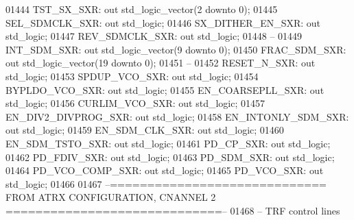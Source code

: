 \begin{DoxyCode}
01444         TST\_SX\_SXR:     \textcolor{keywordflow}{out} \textcolor{comment}{std\_logic\_vector}(\textcolor{vhdllogic}{}\textcolor{vhdllogic}{2} \textcolor{keywordflow}{downto} \textcolor{vhdllogic}{}\textcolor{vhdllogic}{0});
01445         SEL\_SDMCLK\_SXR: \textcolor{keywordflow}{out} \textcolor{comment}{std\_logic};
01446         SX\_DITHER\_EN\_SXR:   \textcolor{keywordflow}{out} \textcolor{comment}{std\_logic};
01447         REV\_SDMCLK\_SXR: \textcolor{keywordflow}{out} \textcolor{comment}{std\_logic};
01448 \textcolor{keyword}{        --}
01449         INT\_SDM\_SXR:    \textcolor{keywordflow}{out} \textcolor{comment}{std\_logic\_vector}(\textcolor{vhdllogic}{}\textcolor{vhdllogic}{9} \textcolor{keywordflow}{downto} \textcolor{vhdllogic}{}\textcolor{vhdllogic}{0});
01450         FRAC\_SDM\_SXR:   \textcolor{keywordflow}{out} \textcolor{comment}{std\_logic\_vector}(\textcolor{vhdllogic}{}\textcolor{vhdllogic}{19} \textcolor{keywordflow}{downto} \textcolor{vhdllogic}{}\textcolor{vhdllogic}{0});
01451 \textcolor{keyword}{        --}
01452         RESET\_N\_SXR:    \textcolor{keywordflow}{out} \textcolor{comment}{std\_logic};
01453         SPDUP\_VCO\_SXR:  \textcolor{keywordflow}{out} \textcolor{comment}{std\_logic};
01454         BYPLDO\_VCO\_SXR: \textcolor{keywordflow}{out} \textcolor{comment}{std\_logic};
01455         EN\_COARSEPLL\_SXR:   \textcolor{keywordflow}{out} \textcolor{comment}{std\_logic};
01456         CURLIM\_VCO\_SXR: \textcolor{keywordflow}{out} \textcolor{comment}{std\_logic};
01457         EN\_DIV2\_DIVPROG\_SXR:    \textcolor{keywordflow}{out} \textcolor{comment}{std\_logic};
01458         EN\_INTONLY\_SDM\_SXR: \textcolor{keywordflow}{out} \textcolor{comment}{std\_logic};
01459         EN\_SDM\_CLK\_SXR: \textcolor{keywordflow}{out} \textcolor{comment}{std\_logic};
01460         EN\_SDM\_TSTO\_SXR:    \textcolor{keywordflow}{out} \textcolor{comment}{std\_logic};
01461         PD\_CP\_SXR:      \textcolor{keywordflow}{out} \textcolor{comment}{std\_logic};
01462         PD\_FDIV\_SXR:    \textcolor{keywordflow}{out} \textcolor{comment}{std\_logic};
01463         PD\_SDM\_SXR:     \textcolor{keywordflow}{out} \textcolor{comment}{std\_logic};
01464         PD\_VCO\_COMP\_SXR:    \textcolor{keywordflow}{out} \textcolor{comment}{std\_logic};
01465         PD\_VCO\_SXR:     \textcolor{keywordflow}{out} \textcolor{comment}{std\_logic};
01466         
01467 \textcolor{keyword}{        --============================= FROM ATRX CONFIGURATION, CNANNEL 2 =============================--}
01468 \textcolor{keyword}{        -- TRF control lines}

\end{DoxyCode}
